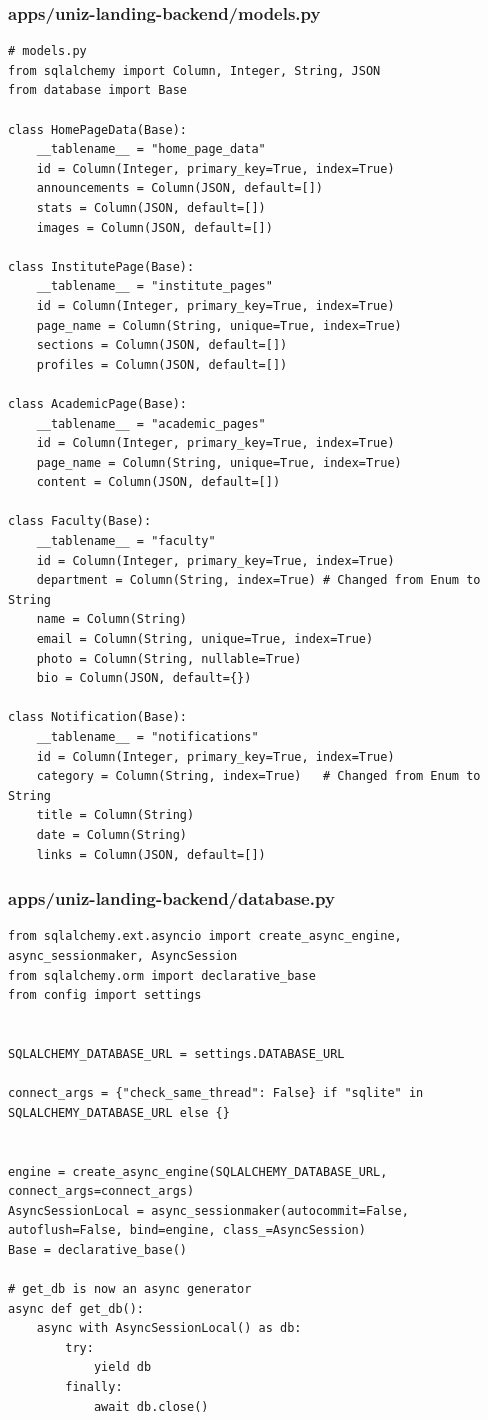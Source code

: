 \documentclass[11pt,a4paper,oneside]{article}
\begin{document}
\subsubsection*{apps/uniz-landing-backend/models.py}
\begin{lstlisting}
# models.py
from sqlalchemy import Column, Integer, String, JSON
from database import Base

class HomePageData(Base):
    __tablename__ = "home_page_data"
    id = Column(Integer, primary_key=True, index=True)
    announcements = Column(JSON, default=[])
    stats = Column(JSON, default=[])
    images = Column(JSON, default=[])

class InstitutePage(Base):
    __tablename__ = "institute_pages"
    id = Column(Integer, primary_key=True, index=True)
    page_name = Column(String, unique=True, index=True) 
    sections = Column(JSON, default=[])
    profiles = Column(JSON, default=[])

class AcademicPage(Base):
    __tablename__ = "academic_pages"
    id = Column(Integer, primary_key=True, index=True)
    page_name = Column(String, unique=True, index=True)
    content = Column(JSON, default=[])

class Faculty(Base):
    __tablename__ = "faculty"
    id = Column(Integer, primary_key=True, index=True)
    department = Column(String, index=True) # Changed from Enum to String
    name = Column(String)
    email = Column(String, unique=True, index=True)
    photo = Column(String, nullable=True)
    bio = Column(JSON, default={})

class Notification(Base):
    __tablename__ = "notifications"
    id = Column(Integer, primary_key=True, index=True)
    category = Column(String, index=True)   # Changed from Enum to String
    title = Column(String)
    date = Column(String)
    links = Column(JSON, default=[])
\end{lstlisting}
\subsubsection*{apps/uniz-landing-backend/database.py}
\begin{lstlisting}
from sqlalchemy.ext.asyncio import create_async_engine, async_sessionmaker, AsyncSession
from sqlalchemy.orm import declarative_base
from config import settings


SQLALCHEMY_DATABASE_URL = settings.DATABASE_URL

connect_args = {"check_same_thread": False} if "sqlite" in SQLALCHEMY_DATABASE_URL else {}


engine = create_async_engine(SQLALCHEMY_DATABASE_URL, connect_args=connect_args)
AsyncSessionLocal = async_sessionmaker(autocommit=False, autoflush=False, bind=engine, class_=AsyncSession)
Base = declarative_base()

# get_db is now an async generator
async def get_db():
    async with AsyncSessionLocal() as db:
        try:
            yield db
        finally:
            await db.close()
\end{lstlisting}
\end{document}
